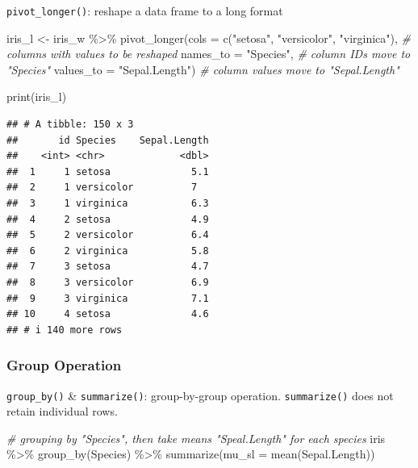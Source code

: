 \documentclass[
]{article}
\newenvironment{Shaded}{\begin{snugshade}}{\end{snugshade}}
\newcommand{\AttributeTok}[1]{\textcolor[rgb]{0.77,0.63,0.00}{#1}}
\newcommand{\CommentTok}[1]{\textcolor[rgb]{0.56,0.35,0.01}{\textit{#1}}}
\newcommand{\FunctionTok}[1]{\textcolor[rgb]{0.00,0.00,0.00}{#1}}
\newcommand{\NormalTok}[1]{#1}
\newcommand{\OtherTok}[1]{\textcolor[rgb]{0.56,0.35,0.01}{#1}}
\newcommand{\SpecialCharTok}[1]{\textcolor[rgb]{0.00,0.00,0.00}{#1}}
\newcommand{\StringTok}[1]{\textcolor[rgb]{0.31,0.60,0.02}{#1}}
\begin{document}
\texttt{pivot\_longer()}: reshape a data frame to a long format

\begin{Shaded}
\begin{Highlighting}[]
\NormalTok{iris\_l }\OtherTok{\textless{}{-}}\NormalTok{ iris\_w }\SpecialCharTok{\%\textgreater{}\%} 
  \FunctionTok{pivot\_longer}\NormalTok{(}\AttributeTok{cols =} \FunctionTok{c}\NormalTok{(}\StringTok{"setosa"}\NormalTok{,}
                        \StringTok{"versicolor"}\NormalTok{,}
                        \StringTok{"virginica"}\NormalTok{), }\CommentTok{\# columns with values to be reshaped}
               \AttributeTok{names\_to =} \StringTok{"Species"}\NormalTok{, }\CommentTok{\# column IDs move to "Species"}
               \AttributeTok{values\_to =} \StringTok{"Sepal.Length"}\NormalTok{) }\CommentTok{\# column values move to "Sepal.Length"}

\FunctionTok{print}\NormalTok{(iris\_l)}
\end{Highlighting}
\end{Shaded}

\begin{verbatim}
## # A tibble: 150 x 3
##       id Species    Sepal.Length
##    <int> <chr>             <dbl>
##  1     1 setosa              5.1
##  2     1 versicolor          7  
##  3     1 virginica           6.3
##  4     2 setosa              4.9
##  5     2 versicolor          6.4
##  6     2 virginica           5.8
##  7     3 setosa              4.7
##  8     3 versicolor          6.9
##  9     3 virginica           7.1
## 10     4 setosa              4.6
## # i 140 more rows
\end{verbatim}

\hypertarget{group-operation}{%
\subsubsection{Group Operation}\label{group-operation}}

\texttt{group\_by()} \& \texttt{summarize()}: group-by-group operation. \texttt{summarize()} does not retain individual rows.

\begin{Shaded}
\begin{Highlighting}[]
\CommentTok{\# grouping by "Species", then take means "Speal.Length" for each species}
\NormalTok{iris }\SpecialCharTok{\%\textgreater{}\%} 
  \FunctionTok{group\_by}\NormalTok{(Species) }\SpecialCharTok{\%\textgreater{}\%} 
  \FunctionTok{summarize}\NormalTok{(}\AttributeTok{mu\_sl =} \FunctionTok{mean}\NormalTok{(Sepal.Length))}
\end{Highlighting}
\end{Shaded}
\end{document}
